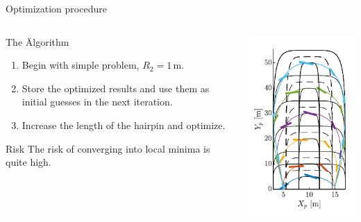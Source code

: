 \begin{frame}{Optimization procedure}
    \begin{columns}
        \begin{column}{0.5\textwidth}
            \begin{block}{The Älgorithm}
                \begin{enumerate}
                    \item Begin with simple problem, $R_{2} = 1$\,m.
                    \item Store the optimized results and use them as initial guesses in the next iteration.
                    \item Increase the length of the hairpin and optimize.
                \end{enumerate} 
            \end{block}    
            \begin{alertblock}{Risk}
                The risk of converging into local minima is quite high.
            \end{alertblock}    
        \end{column}
        \begin{column}{0.3\textwidth}
            \includegraphics{figures/inc_opti_alg.pdf}
        \end{column}
    \end{columns}
\end{frame}